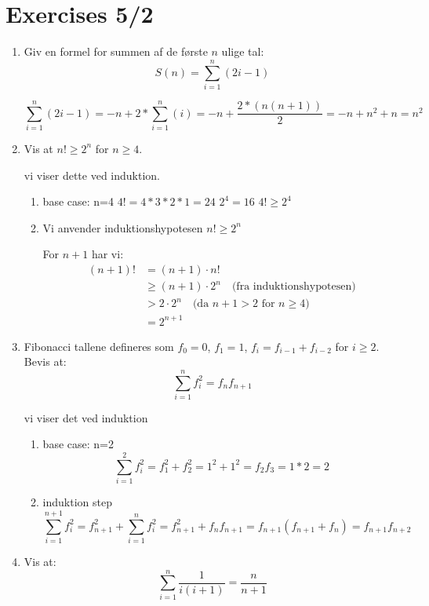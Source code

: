 \documentclass{article}
\theoremstyle{definition}
\begin{document}
\section{Exercises 5/2}

\begin{enumerate}
    \item Giv en formel for summen af de første $n$ ulige tal:
    \[ S(n) = \sum_{i=1}^n (2i-1) \]

    \[
    \sum_{i=1}^n (2i-1) = -n + 2*\sum_{i=1}^n (i) = -n + \frac{2*(n(n+1))}{2} = -n + n^2 + n = n^2
    \]

    \item Vis at $n! \geq 2^n$ for $n \geq 4$.
    
    vi viser dette ved induktion.
    \begin{enumerate}
        \item base case: n=4
        $4! = 4*3*2*1=24$
        $2^4 = 16$
        $4! \geq 2^4$

        \item Vi anvender induktionshypotesen $n! \geq 2^n$
        
        For $n+1$ har vi:
        \begin{align*}
            (n+1)! &= (n+1) \cdot n! \\
            &\geq (n+1) \cdot 2^n \quad \text{(fra induktionshypotesen)} \\
            &> 2 \cdot 2^n \quad \text{(da $n+1 > 2$ for $n \geq 4$)} \\
            &= 2^{n+1}
        \end{align*}
    \end{enumerate}

    \item Fibonacci tallene defineres som $f_0 = 0$, $f_1 = 1$, $f_i = f_{i-1} + f_{i-2}$ for $i \geq 2$. Bevis at:
    \[ \sum_{i=1}^n f_i^2 = f_n f_{n+1} \]

    vi viser det ved induktion
    \begin{enumerate}
        \item base case: n=2
        \[ \sum_{i=1}^2 f_i^2 = f_1^2 + f_2^2 = 1^2 + 1^2 = f_2 f_{3} = 1*2 = 2 \]
        \item induktion step
        \[ \sum_{i=1}^{n+1} f_i^2 = f_{n+1}^2 + \sum_{i=1}^n f_i^2 = f_{n+1}^2 + f_n f_{n+1} = f_{n+1}(f_{n+1} + f_{n}) = f_{n+1}f_{n+2}\]
    \end{enumerate}

    \item Vis at:
    \[ \sum_{i=1}^n \frac{1}{i(i+1)} = \frac{n}{n+1} \]


\end{enumerate}
\end{document}
